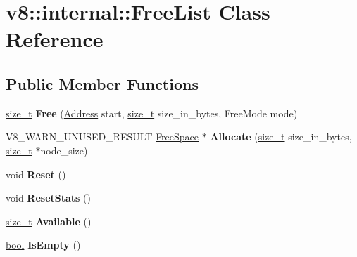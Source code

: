 \hypertarget{classv8_1_1internal_1_1FreeList}{}\section{v8\+:\+:internal\+:\+:Free\+List Class Reference}
\label{classv8_1_1internal_1_1FreeList}
\subsection*{Public Member Functions}
\begin{DoxyCompactItemize}
\item 
\mbox{\label{classv8_1_1internal_1_1FreeList_af27c5d955f1289d9ffa4cf090139e224}} 
\mbox{\hyperlink{classsize__t}{size\+\_\+t}} {\bfseries Free} (\mbox{\hyperlink{classuintptr__t}{Address}} start, \mbox{\hyperlink{classsize__t}{size\+\_\+t}} size\+\_\+in\+\_\+bytes, Free\+Mode mode)
\item 
\mbox{\label{classv8_1_1internal_1_1FreeList_a5445af000ebba58ade2e4566fd2ea9c7}} 
V8\+\_\+\+W\+A\+R\+N\+\_\+\+U\+N\+U\+S\+E\+D\+\_\+\+R\+E\+S\+U\+LT \mbox{\hyperlink{classv8_1_1internal_1_1FreeSpace}{Free\+Space}} $\ast$ {\bfseries Allocate} (\mbox{\hyperlink{classsize__t}{size\+\_\+t}} size\+\_\+in\+\_\+bytes, \mbox{\hyperlink{classsize__t}{size\+\_\+t}} $\ast$node\+\_\+size)
\item 
\mbox{\label{classv8_1_1internal_1_1FreeList_ab4abea8fbd917cb43b9b440ef1010342}} 
void {\bfseries Reset} ()
\item 
\mbox{\label{classv8_1_1internal_1_1FreeList_a83333dbec29d445106f9bcfbe4313816}} 
void {\bfseries Reset\+Stats} ()
\item 
\mbox{\label{classv8_1_1internal_1_1FreeList_abf51753a0ae52b9c3b3143fe2d6e2dc6}} 
\mbox{\hyperlink{classsize__t}{size\+\_\+t}} {\bfseries Available} ()
\item 
\mbox{\label{classv8_1_1internal_1_1FreeList_a7c78f22b1971e2943be876918d163dd0}} 
\mbox{\hyperlink{classbool}{bool}} {\bfseries Is\+Empty} ()
\item 

\end{DoxyCompactItemize}
